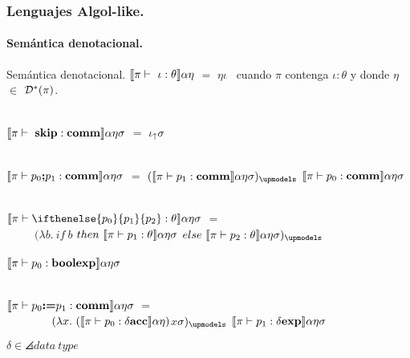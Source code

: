 \documentclass{beamer} %
\begin{document}
\begin{frame}[shrink=1]
\frametitle{Lenguajes Algol-like.}
\framesubtitle{Sem\'antica denotacional.}

\begin{block}{Sem\'antica denotacional.} \small
$\semBrcks{\pi \vdash \ \iota:\theta}\alpha\eta$ $=$ $\eta\iota$ \ cuando $\pi$ contenga $\iota:\theta$ y donde $\eta$ $\in$ $\mathcal{D}^* (\pi)$.\\

\

$\llbracket \pi \vdash \ \textbf{skip} : \textbf{comm} \rrbracket \alpha \eta \sigma$ $=$ $\iota_{\uparrow} \sigma$\\

\

$\llbracket \pi \vdash  p_0 \textbf{;} p_1 : \textbf{comm} \rrbracket \alpha \eta \sigma$ $=$ 
$(\denotalsem{\pi}{p_1:\comm}{\alpha}{\eta}{\sigma})_{\upmodels}$ 
$\llbracket \pi \vdash p_0:\textbf{comm} \rrbracket \alpha \eta \sigma$\\

\

$\denotalsem{\pi}{\ifthenelse{p_0}{p_1}{p_2}:\theta}{\alpha}{\eta}{\sigma}$ $=$ \\
\ \ \ \ \ $(\lambda b . \ if \ b $
$then \ \denotalsem{\pi}{p_1:\theta}{\alpha}{\eta}{\sigma}$
$else \ \denotalsem{\pi}{p_2:\theta}{\alpha}{\eta}{\sigma})_{\upmodels}$ \\
\ \ \ \ \ \ \ \ \ \ \ \ \ \ \ \ \ \ \ \ \ \ \ \ \ \ \ \ \ \ \ \ \ \ \ \ \ \ \ \ \ \ \ \ \ \ \ \ \ \ \ \ \ \ \ \ 
$\llbracket \pi \vdash p_0:\textbf{boolexp} \rrbracket \alpha \eta \sigma$\\

\

$\llbracket \pi \vdash p_0 \textbf{:=} p_1:\textbf{comm} \rrbracket \alpha \eta \sigma$ $=$ \\
\ \ \ \ \ \ \ \ $(\lambda x. \ (\denotalsem{\pi}{p_0:\deltaacc}{\alpha}{\eta})$$x$${\sigma})_{\upmodels}$ 
$\llbracket \pi \vdash p_1:\delta \textbf{exp} \rrbracket \alpha \eta \sigma$ \\
\end{block}
$\delta \in \angles{data \ type}$
\end{frame}
\end{document}
